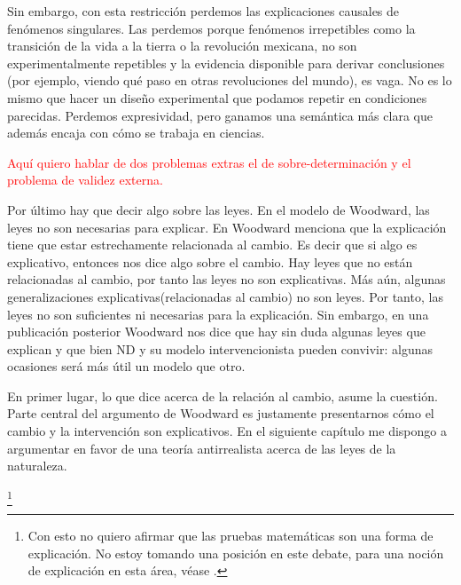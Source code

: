 Sin embargo, con esta restricción perdemos las explicaciones causales de fenómenos singulares. Las perdemos porque fenómenos irrepetibles como la transición de la vida a la tierra o la revolución mexicana, no son experimentalmente repetibles y la evidencia disponible para derivar conclusiones (por ejemplo, viendo qué paso en otras revoluciones del mundo), es vaga. No es lo mismo que hacer un diseño experimental que podamos repetir en condiciones parecidas. Perdemos expresividad, pero ganamos una semántica más clara que además encaja con cómo se trabaja en ciencias.

\textcolor{red}{Aquí quiero hablar de dos problemas extras el de sobre-determinación y el problema de validez externa.}

Por último hay que decir algo sobre las leyes. En el modelo de Woodward, las leyes no son necesarias para explicar. En \cite{Woodward2000} Woodward menciona que la explicación tiene que estar estrechamente relacionada al cambio. Es decir que si algo es explicativo, entonces nos dice algo sobre el cambio. Hay leyes que no están relacionadas al cambio, por tanto las leyes no son explicativas. Más aún, algunas generalizaciones explicativas(relacionadas al cambio) no son leyes. Por tanto, las leyes no son suficientes ni necesarias para la explicación. Sin embargo, en una publicación posterior \citeyear{Woodward2003} Woodward nos dice que hay sin duda algunas leyes que explican y que bien ND y su modelo intervencionista pueden convivir: algunas ocasiones será más útil un modelo que otro.

En primer lugar, lo que dice acerca de la relación al cambio, asume la cuestión. Parte central del argumento de Woodward es justamente presentarnos cómo el cambio y la intervención son explicativos. En el siguiente capítulo me dispongo a argumentar en favor de una teoría antirrealista acerca de las leyes de la naturaleza.




\footnote{Con esto no quiero afirmar que las pruebas matemáticas son una forma de explicación. No estoy tomando una posición en este debate, para una noción de explicación en esta área, véase \cite{Lange2015}.}








